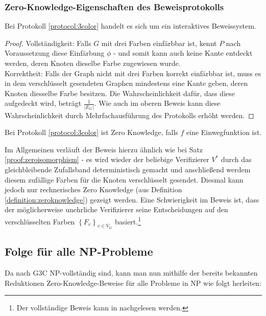 \subsubsection{Zero-Knowledge-Eigenschaften des Beweisprotokolls}

\begin{theorem}
Bei Protokoll \ref{protocol:3color} handelt es sich um ein interaktives Beweissystem.
\end{theorem}

\begin{proof}
Vollständigkeit: Falls \( G \) mit drei Farben einfärbbar ist, kennt \( P \) nach Voraussetzung diese Einfärbung \( \phi \) - und somit kann auch keine Kante entdeckt werden, deren Knoten dieselbe Farbe zugewiesen wurde.\\
Korrektheit: Falls der Graph nicht mit drei Farben korrekt einfärbbar ist, muss es in dem verschlüsselt gesendeten Graphen mindestens eine Kante geben, deren Knoten diesselbe Farbe besitzen. Die Wahrscheinlichkeit dafür, dass diese aufgedeckt wird, beträgt \( \frac{1}{\left| E_G \right|} \). Wie auch im oberen Beweis kann diese Wahrscheinlichkeit durch Mehrfachausführung des Protokolls erhöht werden.
\end{proof}

\begin{theorem}
Bei Protokoll \ref{protocol:3color} ist Zero Knowledge, falls \( f \) eine Einwegfunktion ist.
\end{theorem}

Im Allgemeinen verläuft der Beweis hierzu ähnlich wie bei Satz \ref{proof:zeroisomorphism} - es wird wieder der beliebige Verifizierer \( V^{\ast} \) durch das gleichbleibende Zufallsband deterministisch gemacht und anschließend werdem diesem zufällige Farben für die Knoten verschlüsselt gesendet. Diesmal kann jedoch nur rechnerisches Zero Knowledge (aus Definition \ref{definition:zeroknowledge}) gezeigt werden. Eine Schwierigkeit im Beweis ist, dass der möglicherweise unehrliche Verifizierer seine Entscheidungen auf den verschlüsselten Farben \( \left\lbrace F_v \right\rbrace_{v \in V_G} \) basiert.\footnote{Der vollständige Beweis kann in \cite[Proposition 4]{np} nachgelesen werden.}

\subsection{Folge für alle NP-Probleme}
\label{section:npconsequences}
Da nach \cite{karp} G3C NP-vollständig sind, kann man nun mithilfe der bereits bekannten Reduktionen Zero-Knowledge-Beweise für alle Probleme in NP wie folgt herleiten:

